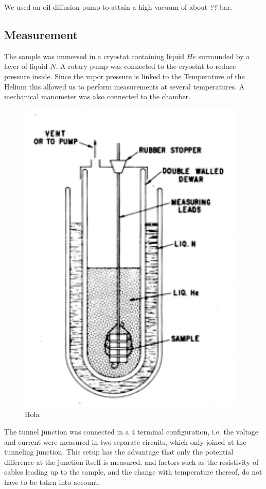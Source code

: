 We used an oil diffusion pump to attain a high vacuum of about \emph{??} bar.\\

\subsection{Measurement}
The sample was immersed in a cryostat containing liquid $He$ surrounded by a layer of liquid $N$. A rotary pump was connected to the cryostat to reduce pressure inside. Since the vapor pressure is linked to the Temperature of the Helium this allowed us to perform measurements at several temperatures. A mechanical manometer was also connected to the chamber.\\

\begin{figure}
\centering
\includegraphics[scale=0.6]{cryostat.pdf}
\caption{Hola\label{cryostat}}
\end{figure}


The tunnel junction was connected in a 4 terminal configuration, i.e. the voltage and current were measured in two separate circuits, which only joined at the tunneling junction. This setup has the advantage that only the potential difference at the junction itself is measured, and factors such as the resistivity of cables leading up to the sample, and the change with temperature thereof, do not have to be taken into account. \\


